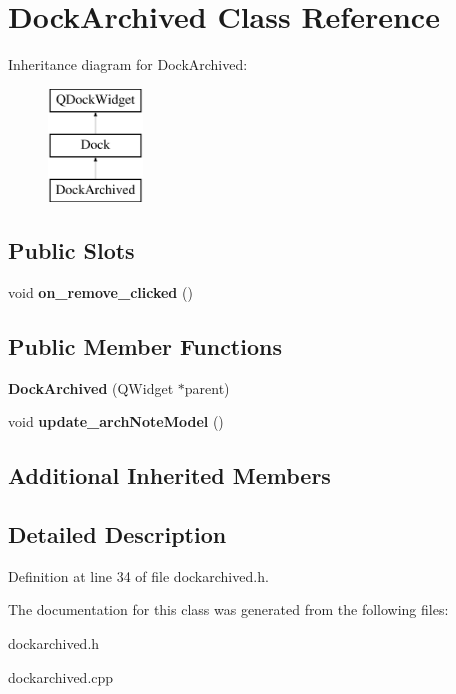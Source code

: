 \hypertarget{class_dock_archived}{}\section{Dock\+Archived Class Reference}
\label{class_dock_archived}
Inheritance diagram for Dock\+Archived\+:\begin{figure}[H]
\begin{center}
\leavevmode
\includegraphics[height=3.000000cm]{class_dock_archived}
\end{center}
\end{figure}
\subsection*{Public Slots}
\begin{DoxyCompactItemize}
\item 
\mbox{\label{class_dock_archived_ab2ec83022057fff8169784cf02876a8a}} 
void {\bfseries on\+\_\+remove\+\_\+clicked} ()
\end{DoxyCompactItemize}
\subsection*{Public Member Functions}
\begin{DoxyCompactItemize}
\item 
\mbox{\label{class_dock_archived_ad3cc1b3cbaa84fed8d37c478927c7463}} 
{\bfseries Dock\+Archived} (Q\+Widget $\ast$parent)
\item 
\mbox{\label{class_dock_archived_a557ea9fc3b685f0aefbae0bcd624cbec}} 
void {\bfseries update\+\_\+arch\+Note\+Model} ()
\end{DoxyCompactItemize}
\subsection*{Additional Inherited Members}


\subsection{Detailed Description}


Definition at line 34 of file dockarchived.\+h.



The documentation for this class was generated from the following files\+:\begin{DoxyCompactItemize}
\item 
dockarchived.\+h\item 
dockarchived.\+cpp\end{DoxyCompactItemize}
